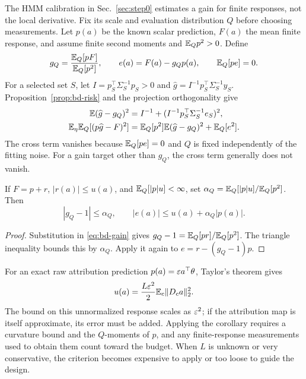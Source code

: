 The HMM calibration in Sec.~\ref{sec:step0} estimates a gain for finite
responses, not the local derivative. Fix its scale and evaluation distribution
$Q$ before choosing measurements. Let $p(a)$ be the known scalar prediction,
$F(a)$ the mean finite response, and assume finite second moments and
$\mathbb{E}_Qp^2>0$. Define
\begin{equation}\label{eq:bd-gain}
 g_Q=\frac{\mathbb{E}_Q[pF]}{\mathbb{E}_Q[p^2]},\qquad
 e(a)=F(a)-g_Qp(a),\qquad \mathbb{E}_Q[pe]=0.
\end{equation}
For a selected set $S$, let $I=p_S^\top\Sigma_S^{-1}p_S>0$ and
$\widehat g=I^{-1}p_S^\top\Sigma_S^{-1}y_S$. Proposition~\ref{prop:bd-risk}
and the projection orthogonality give
\begin{align}
 \mathbb{E}(\widehat g-g_Q)^2
 &=I^{-1}+(I^{-1}p_S^\top\Sigma_S^{-1}e_S)^2,\label{eq:bd-gainrisk}\\
 \mathbb{E}_\eta\mathbb{E}_Q[(p\widehat g-F)^2]
 &=\mathbb{E}_Q[p^2]\mathbb{E}(\widehat g-g_Q)^2+\mathbb{E}_Q[e^2].\label{eq:bd-prediction}
\end{align}
The cross term vanishes because $\mathbb{E}_Q[pe]=0$ and $Q$ is fixed independently
of the fitting noise. For a gain target other than $g_Q$, the cross term
generally does not vanish.

\begin{corollary}\label{cor:bd-gain}
If $F=p+r$, $|r(a)|\leq u(a)$, and $\mathbb{E}_Q[|p|u]<\infty$, set
$\alpha_Q=\mathbb{E}_Q[|p|u]/\mathbb{E}_Q[p^2]$. Then
\begin{equation}\label{eq:bd-gainbound}
 |g_Q-1|\leq\alpha_Q,\qquad
 |e(a)|\leq u(a)+\alpha_Q|p(a)|.
\end{equation}
\end{corollary}
\begin{proof}
Substitution in \eqref{eq:bd-gain} gives
$g_Q-1=\mathbb{E}_Q[pr]/\mathbb{E}_Q[p^2]$. The triangle inequality bounds this by
$\alpha_Q$. Apply it again to $e=r-(g_Q-1)p$.
\end{proof}

For an exact raw attribution prediction $p(a)=\varepsilon a^\top\theta$, Taylor's
theorem gives
\begin{equation}
 u(a)=\frac{L\varepsilon^2}{2}\mathbb{E}_c\|D_ca\|_2^2.
\end{equation}
The bound on this unnormalized response scales as $\varepsilon^2$; if the
attribution map is itself approximate, its error must be added. Applying the
corollary requires a curvature bound and the $Q$-moments of $p$, and any
finite-response measurements used to obtain them count toward the budget.
When $L$ is unknown or very conservative, the criterion becomes expensive
to apply or too loose to guide the design.

